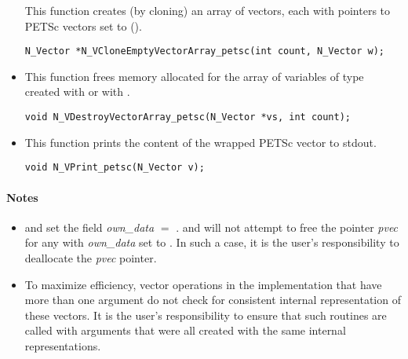 \begin{itemize}
  This function creates (by cloning) an array of  {\nvecpetsc} vectors,
  each with pointers to PETSc vectors set to ().
 
\begin{verbatim}
N_Vector *N_VCloneEmptyVectorArray_petsc(int count, N_Vector w);
\end{verbatim}


\item {}
 
 This function frees memory allocated for the array of  variables of
 type  created with  or with
 .
 

 \verb|void N_VDestroyVectorArray_petsc(N_Vector *vs, int count);|



\item {}
  
  This function prints the content of the wrapped PETSc vector to stdout.
 
    
  \verb|void N_VPrint_petsc(N_Vector v);|


\end{itemize}
\paragraph{\bf Notes} 
           
\begin{itemize}
                                        
\item
  {\warn} and  
  set the field {\em own\_data} $=$ .  
   and 
  will not attempt to free the pointer {\em pvec} for any  with
  {\em own\_data} set to . In such a case, it is the user's responsibility to
  deallocate the {\em pvec} pointer.

\item
  {\warn}To maximize efficiency, vector operations in the {\nvecpetsc} implementation
  that have more than one  argument do not check for
  consistent internal representation of these vectors. It is the user's 
  responsibility to ensure that such routines are called with 
  arguments that were all created with the same internal representations.

\end{itemize}

